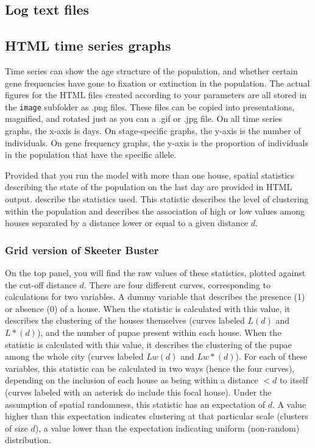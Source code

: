 \documentclass[11pt]{article}
\newcommand{\linecmd}[1]{\texttt{#1}}
\begin{document}
\subsection{Log text files}



\subsection{HTML time series graphs}

Time series can show the age structure of the population, and whether certain gene frequencies have gone to fixation or extinction in the population. The actual figures for the HTML files created according to your parameters are all stored in the \linecmd{image} subfolder as .png files. These files can be copied into presentations, magnified, and rotated just as you can a .gif or .jpg file. On all time series graphs, the x-axis is days. On stage-specific graphs, the y-axis is the number of individuals. On gene frequency graphs, the y-axis is the proportion of individuals in the population that have the specific allele.

Provided that you run the model with more than one house, spatial statistics describing the state of the population on the last day are provided in HTML output. \cite{getis2010characteristics} describe the statistics used. This %
statistic describes the level of clustering within the population and describes the association of high or low values among houses separated by a distance lower or equal to a given distance $d$.

\subsubsection{Grid version of Skeeter Buster}

On the top panel, you will find the raw values of these statistics, plotted against the cut-off distance $d$. There are four different curves, corresponding to calculations for two variables. A dummy variable that describes the presence (1) or absence (0) of a house. When the statistic is calculated with this value, it describes the clustering of the houses themselves (curves labeled $L(d)$ and $L*(d)$), and the number of pupae present within each house. When the statistic is calculated with this value, it describes the clustering of the pupae among the whole city (curves labeled $Lw(d)$ and $Lw*(d)$). For each of these variables, this statistic can be calculated in two ways (hence the four curves), depending on the inclusion of each house as being within a distance $<d$ to itself (curves labeled with an asterisk do include this focal house). Under the assumption of spatial randomness, this statistic has an expectation of $d$. A value higher than this expectation indicates clustering at that particular scale (clusters of size $d$), a value lower than the expectation indicating uniform (non-random) distribution.
\end{document}
